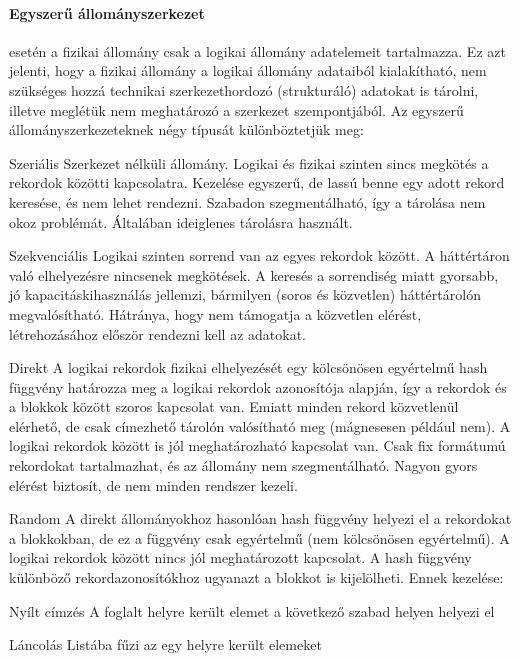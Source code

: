 \paragraph{Egyszerű állományszerkezet} esetén a fizikai állomány csak a logikai állomány adatelemeit tartalmazza. Ez azt jelenti, hogy a fizikai állomány a logikai állomány adataiból kialakítható, nem szükséges hozzá technikai szerkezethordozó (strukturáló) adatokat is tárolni, illetve meglétük nem meghatározó a szerkezet szempontjából. Az egyszerű állományszerkezeteknek négy típusát különböztetjük meg:
\begin{enumdescript}[nosep]
	\item[Szeriális] Szerkezet nélküli állomány. Logikai és fizikai szinten sincs megkötés a rekordok közötti kapcsolatra. Kezelése egyszerű, de lassú benne egy adott rekord keresése, és nem lehet rendezni. Szabadon szegmentálható, így a tárolása nem okoz problémát. Általában ideiglenes tárolásra használt.
	\item[Szekvenciális] Logikai szinten sorrend van az egyes rekordok között. A háttértáron való elhelyezésre nincsenek megkötések. A keresés a sorrendiség miatt gyorsabb, jó kapacitáskihasználás jellemzi, bármilyen (soros és közvetlen) háttértárolón megvalósítható. Hátránya, hogy nem támogatja a közvetlen elérést, létrehozásához először rendezni kell az adatokat.
	\item[Direkt] A logikai rekordok fizikai elhelyezését egy kölcsönösen egyértelmű hash függvény határozza meg a logikai rekordok azonosítója alapján, így a rekordok és a blokkok között szoros kapcsolat van. Emiatt minden rekord közvetlenül elérhető, de csak címezhető tárolón valósítható meg (mágnesesen például nem). A logikai rekordok között is jól meghatározható kapcsolat van. Csak fix formátumú rekordokat tartalmazhat, és az állomány nem szegmentálható. Nagyon gyors elérést biztosít, de nem minden rendszer kezeli.
	\item[Random] A direkt állományokhoz hasonlóan hash függvény helyezi el a rekordokat a blokkokban, de ez a függvény csak egyértelmű (nem kölcsönösen egyértelmű). A logikai rekordok között nincs jól meghatározott kapcsolat. A hash függvény különböző rekordazonosítókhoz ugyanazt a blokkot is kijelölheti. Ennek kezelése:
	\begin{enumdescript}[noitemsep]
		\item[Nyílt címzés] A foglalt helyre került elemet a következő szabad helyen helyezi el
		\item[Láncolás] Listába fűzi az egy helyre került elemeket
	\end{enumdescript}
\end{enumdescript}

